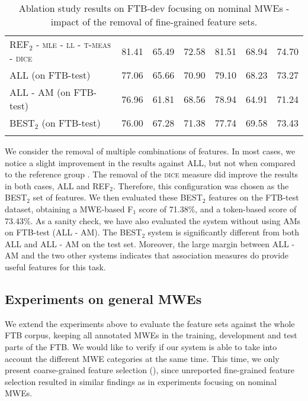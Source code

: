 \documentclass[output=paper,
modfonts
]{langscibook}
\begin{document}
\begin{table*}
\begin{tabular}{l@{~~~}c@{~~~}c@{~~~}c@{~~~~~~~~}c@{~~~}c@{~~~}c}
\textsc{REF$_2$} - \textsc{mle} - \textsc{ll} - \textsc{t-meas} - \textsc{dice} & 81.41 & 65.49 & 72.58 & 81.51 & 68.94 & 74.70 \\ %
\lspbottomrule
\textsc{ALL} (on FTB-test) & 77.06 & 65.66 & 70.90 & 79.10 & 68.23 & 73.27 \\ 
\textsc{ALL - \textsc{AM}} (on FTB-test) & 76.96 & 61.81 & 68.56 & 78.94 & 64.91 & 71.24 \\ 
\textsc{BEST$_2$} (on FTB-test) & 76.00 & 67.28 & 71.38 & 77.74 & 69.58 & 73.43 \\ 
\lspbottomrule
\end{tabular}
\caption{Ablation study results on FTB-dev focusing on nominal MWEs - impact of the removal of fine-grained feature sets.}
\label{tab:ftbNMWEsFine}
\end{table*}

We consider the removal of multiple combinations of features. In most cases, we notice a slight improvement in the results against ALL, but not when compared to the reference group . %
The removal of the \textsc{dice} measure did improve the results in both cases, ALL and REF$_2$. Therefore, this configuration was chosen as the BEST$_2$ set of features.
We then evaluated these BEST$_2$ features on the FTB-test dataset, obtaining a MWE-based F$_1$ score of 71.38\%, and a token-based score of 73.43\%. As a sanity check, we have also evaluated the system without using AMs on FTB-test (\textsc{ALL - \textsc{AM}}). The \textsc{BEST$_2$} system is significantly different from both \textsc{ALL} and \textsc{ALL - \textsc{AM}} on the test set. Moreover, the large margin between \textsc{ALL - \textsc{AM}} and the two other systems indicates that association measures do provide useful features for this task.



\subsection{Experiments on general MWEs}
\label{schol:sec:results-general}

We extend the experiments above to evaluate the feature sets against the whole FTB corpus, keeping all annotated MWEs in the training, development and test parts of the FTB. We would like to verify if our system is able to take into account the different MWE categories at the same time. This time, we only present coarse-grained feature selection (), since unreported fine-grained feature selection resulted in similar findings as in experiments focusing on nominal MWEs.
\end{document}
